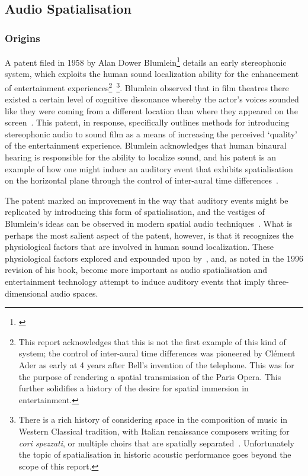 \subsection{Audio Spatialisation}\label{subsec:audio-spatialisation}
\subsubsection{Origins}

A patent filed in 1958 by Alan Dower Blumlein\footnote{\citep{blumlein-patent}} details an early stereophonic system, which exploits the human sound localization ability for the enhancement of entertainment experiences\footnote{This report acknowledges that this is not the first example of this kind of system; the control of inter-aural time differences was pioneered by Cl\'ement Ader as early at 4 years after Bell's invention of the telephone. This was for the purpose of rendering a spatial transmission of the Paris Opera. This further solidifies a history of the desire for spatial immersion in entertainment.}~\footnote{There is a rich history of considering space in the composition of music in Western Classical tradition, with Italian renaissance composers writing for \textit{cori spezzati}, or multiple choirs that are spatially separated~\citep{spezzati}. Unfortunately the topic of spatialisation in historic acoustic performance goes beyond the scope of this report.}.
Blumlein observed that in film theatres there existed a certain level of cognitive dissonance whereby the actor’s voices sounded like they were coming from a different location than where they appeared on the screen~\citep{alexander_blumlein}.
This patent, in response,
specifically outlines methods for introducing stereophonic audio to sound film as a means
of increasing the perceived `quality' of the entertainment experience.
Blumlein acknowledges that human binaural hearing is responsible for the ability to localize sound, and his patent is an example of how one might induce an auditory event that exhibits spatialisation on the horizontal plane through the control of inter-aural time differences~\citep{blumlein-patent}.

The patent marked an improvement in the way that auditory events might be replicated by introducing this form of spatialisation, and the vestiges of Blumlein`s ideas can be observed in modern spatial audio techniques~\citep{spatial_techniques, beyer_acoustics}.
What is perhaps the most salient aspect of the patent, however, is that it recognizes the physiological factors that are involved in human sound localization.
These physiological factors explored and expounded upon by~\citet{blauert_spatial}, and, as noted in the 1996 revision of his book, become more important as audio spatialisation and entertainment technology attempt to induce auditory events that imply three-dimensional audio spaces.

